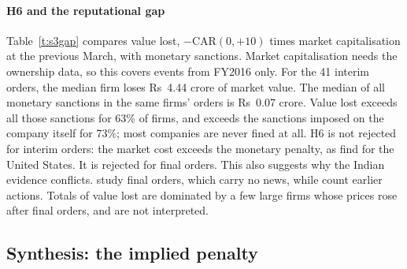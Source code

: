 \documentclass[letterpaper,11pt,leqno]{article}
\begin{document}
\paragraph{H6 and the reputational gap} Table~\ref{t:s3gap} compares value lost, $-\text{CAR}(0,+10)$ times market capitalisation at the previous March, with monetary sanctions. Market capitalisation needs the ownership data, so this covers events from FY2016 only. For the 41 interim orders, the median firm loses Rs~4.44 crore of market value. The median of all monetary sanctions in the same firms' orders is Rs~0.07 crore. Value lost exceeds all those sanctions for 63\% of firms, and exceeds the sanctions imposed on the company itself for 73\%; most companies are never fined at all. H6 is not rejected for interim orders: the market cost exceeds the monetary penalty, as \citet{KLM08} find for the United States. It is rejected for final orders. This also suggests why the Indian evidence conflicts. \citet{GPS26} study final orders, which carry no news, while \citet{J22} count earlier actions. Totals of value lost are dominated by a few large firms whose prices rose after final orders, and are not interpreted.

\begin{table}[htb]
\caption{Market value lost and monetary sanctions, Rs crore}
{\footnotesize}
\label{t:s3gap}\end{table}

\begin{table}[htb]
\caption{Firms suspended at the event: bounds on the mean CAR(0,+10), percent}

\label{t:s3susp}\end{table}

\subsection{Synthesis: the implied penalty}\label{s:r4}
\end{document}

